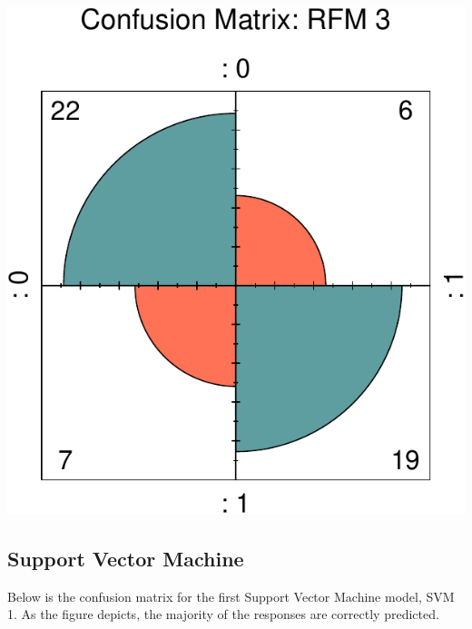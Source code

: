 \documentclass[11pt,preprint, authoryear]{elsarticle}
\numberwithin{equation}{section}
\numberwithin{figure}{section}
\numberwithin{table}{section}
\begin{document}
\includegraphics{ML_project_files/figure-latex/unnamed-chunk-16-1.pdf}

\newpage

\hypertarget{support-vector-machine-1}{%
\subsection{Support Vector Machine}\label{support-vector-machine-1}}

Below is the confusion matrix for the first Support Vector Machine
model, SVM 1. As the figure depicts, the majority of the responses are
correctly predicted.
\end{document}
